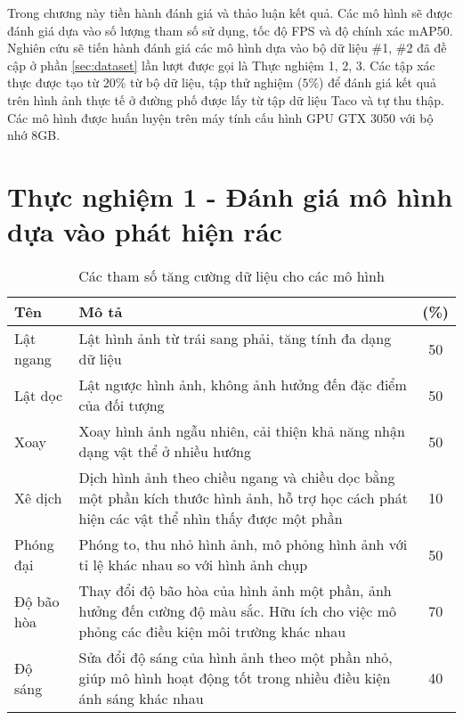 \documentclass[../the.tex]{subfiles}
\begin{document}
{\fontsize{13}{12} \selectfont
Trong chương này tiền hành đánh giá và thảo luận kết quả. Các mô hình sẽ được đánh giá dựa vào số lượng tham số sử dụng, tốc độ FPS và độ chính xác mAP50.
Nghiên cứu sẽ tiến hành đánh giá các mô hình dựa vào bộ dữ liệu \#1, \#2 đã đề cập ở phần \ref{sec:dataset} lần lượt được gọi là Thực nghiệm 1, 2, 3.
Các tập xác thực được tạo từ $20\%$ từ bộ dữ liệu, tập thử nghiệm ($5\%$) để đánh giá kết quả trên hình ảnh thực tế ở đường phố được lấy từ tập dữ liệu Taco và tự thu thập.
Các mô hình được huấn luyện trên máy tính cấu hình GPU GTX 3050 với bộ nhớ 8GB.
}

\section{Thực nghiệm 1 - Đánh giá mô hình dựa vào phát hiện rác}
\begin{table}[ht!]
    \centering
    \caption{Các tham số tăng cường dữ liệu cho các mô hình}
    \begin{tabular}{|l|p{7cm}|c|}
        \hline
        \textbf{Tên}
                   & \textbf{Mô tả}
                   & \textbf{(\%)}
        \\ \hline
        Lật ngang  & Lật hình ảnh từ trái sang phải, tăng tính đa dạng dữ liệu                                                                                    & 50 \\  \hline
        Lật dọc    & Lật ngược hình ảnh, không ảnh hưởng đến đặc điểm của đối tượng                                                                               & 50 \\  \hline
        Xoay       & Xoay hình ảnh ngẫu nhiên, cải thiện khả năng nhận dạng vật thể ở nhiều hướng                                                                 & 50 \\  \hline
        Xê dịch    & Dịch hình ảnh theo chiều ngang và chiều dọc bằng một phần kích thước hình ảnh, hỗ trợ học cách phát hiện các vật thể nhìn thấy được một phần & 10 \\  \hline
        Phóng đại      & Phóng to, thu nhỏ hình ảnh, mô phỏng hình ảnh với tỉ lệ khác nhau so với hình ảnh chụp                                                       & 50 \\  \hline
        Độ bão hòa & Thay đổi độ bão hòa của hình ảnh một phần, ảnh hưởng đến cường độ màu sắc. Hữu ích cho việc mô phỏng các điều kiện môi trường khác nhau      & 70 \\ \hline
        Độ sáng    & Sửa đổi độ sáng của hình ảnh theo một phần nhỏ, giúp mô hình hoạt động tốt trong nhiều điều kiện ánh sáng khác nhau                          & 40 \\ \hline
    \end{tabular}
    \label{tab:thamso}
\end{table}
\end{document}
